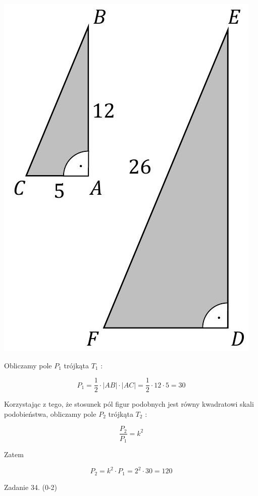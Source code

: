 \documentclass[10pt]{article}
\begin{document}
\begin{center}
\includegraphics[max width=\textwidth]{2025_02_07_83b95a6405af75d2626bg-26(1)}
\end{center}

Obliczamy pole $P_{1}$ trójkąta $T_{1}$ :

$$
P_{1}=\frac{1}{2} \cdot|A B| \cdot|A C|=\frac{1}{2} \cdot 12 \cdot 5=30
$$

Korzystając z tego, że stosunek pól figur podobnych jest równy kwadratowi skali podobieństwa, obliczamy pole $P_{2}$ trójkąta $T_{2}$ :

$$
\frac{P_{2}}{P_{1}}=k^{2}
$$

Zatem

$$
P_{2}=k^{2} \cdot P_{1}=2^{2} \cdot 30=120
$$

Zadanie 34. (0-2)
\end{document}
